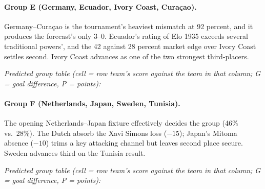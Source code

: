 \documentclass[11pt,letterpaper]{article}
\begin{document}
\paragraph{Group E (Germany, Ecuador, Ivory Coast, Curaçao).} Germany--Curaçao is the tournament's heaviest mismatch at 92 percent, and it produces the forecast's only 3--0. Ecuador's rating of Elo 1935 exceeds several traditional powers', and the 42 against 28 percent market edge over Ivory Coast settles second. Ivory Coast advances as one of the two strongest third-placers.

\noindent\textit{\footnotesize Predicted group table (cell = row team's score against the team in that column; G = goal difference, P = points):}



\paragraph{Group F (Netherlands, Japan, Sweden, Tunisia).} The opening Netherlands--Japan fixture effectively decides the group (46\% vs.\ 28\%). The Dutch absorb the Xavi Simons loss ($-15$); Japan's Mitoma absence ($-10$) trims a key attacking channel but leaves second place secure. Sweden advances third on the Tunisia result.

\noindent\textit{\footnotesize Predicted group table (cell = row team's score against the team in that column; G = goal difference, P = points):}

\end{document}
